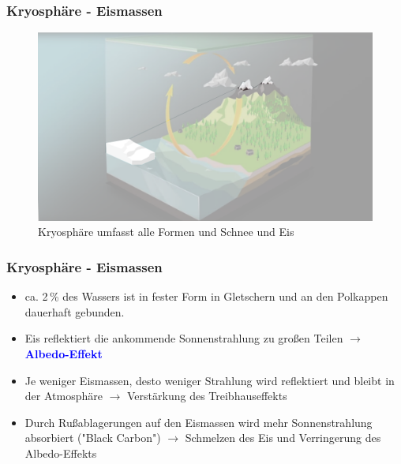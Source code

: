 \begin{frame}
	\frametitle{Kryosphäre - Eismassen}
	
	\begin{figure}
		\centering
		\includegraphics{bilder/WMO_Cycles_ice.png}
		\caption{Kryosphäre umfasst alle Formen und Schnee und Eis}
	\end{figure}
\end{frame}

\begin{frame}
	\frametitle{Kryosphäre - Eismassen} %
	\begin{itemize}
		\item ca. 2\,\% des Wassers ist in fester Form in Gletschern und an den Polkappen dauerhaft gebunden.
		\item Eis reflektiert die ankommende Sonnenstrahlung zu großen Teilen
		$\rightarrow$ \textbf{\textcolor{blue}{Albedo-Effekt}}\\
		
		\item Je weniger Eismassen, desto weniger Strahlung wird reflektiert und bleibt in der Atmosphäre $\rightarrow$ Verstärkung des Treibhauseffekts
		
		\item Durch Rußablagerungen auf den Eismassen wird mehr Sonnenstrahlung absorbiert ("Black Carbon")
		 $\rightarrow$ Schmelzen des Eis und Verringerung des Albedo-Effekts %
	\end{itemize}
	
\end{frame}

